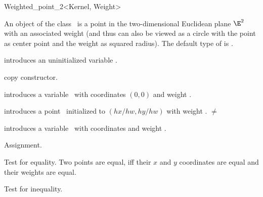 \begin{ccRefClass} {Weighted_point_2<Kernel, Weight>}

\ccDefinition 

An object of the class \ccRefName\ is a point in the two-dimensional
Euclidean plane $\E^2$ with an associated weight (and thus can also be
viewed as a circle with the point as center point and the weight as
squared radius). The default type of  is .

\ccInheritsFrom
{}

\ccTypes


\ccCreation
{}

\ccHidden {}
             {introduces an uninitialized variable \ccVar.}

\ccHidden {}
            {copy constructor.}

            {introduces a variable \ccVar\ with  
             coordinates $(0,0)$ and weight .}

            {introduces a point \ccVar\ initialized to $(hx/hw,hy/hw)$ with 
             weight .
             \ccPrecond {} $\neq$  }

            {introduces a variable \ccVar\ with  
             coordinates  and weight .}


\ccOperations

\ccHidden 
{}
        {Assignment.}

       {Test for equality. Two points are equal, iff their $x$ and $y$ 
        coordinates are equal and their weights are equal.}

       {Test for inequality.}


\end{ccRefClass}
